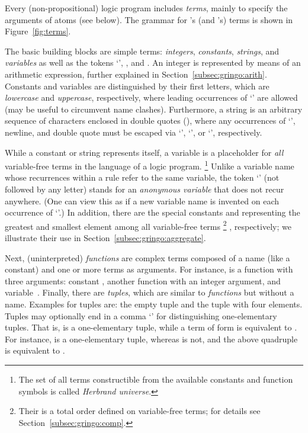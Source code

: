 Every (non-propositional) logic program includes \emph{terms},
mainly to specify the arguments of atoms (see below).
The grammar for \gringo's (and \clingo's) terms is shown in Figure~\ref{fig:terms}.

The basic building blocks are simple terms:
\emph{integers}, \emph{constants}, \emph{strings}, and \emph{variables}
as well as the tokens `', , and .
An integer is represented by means of an arithmetic expression,
further explained in Section~\ref{subsec:gringo:arith}.
Constants and variables are distinguished by their first letters,
which are \emph{lowercase} and \emph{uppercase}, respectively,
where leading occurrences of `' are allowed
(may be useful to circumvent name clashes).
Furthermore, a string is an arbitrary sequence of characters
enclosed in double quotes (),
where any occurrences of `\code{\textbackslash}', newline, and double quote
must be escaped via `\code{\textbackslash\textbackslash}', `',
or `', respectively.

While a constant or string represents itself,
a variable is a placeholder for \emph{all} variable-free terms
in the language of a logic program.%
\footnote{The set of all terms constructible from the available
          constants and function symbols is called \emph{Herbrand universe}.}
Unlike a variable name whose recurrences within a rule refer to the same variable,
the token `' (not followed by any letter)
stands for an \emph{anonymous variable} that does not recur anywhere.
(One can view this as if a new variable name is invented on each occurrence of `'.)
In addition, there are the special constants  and 
representing the greatest and smallest element among all variable-free terms%
\footnote{Their is a total order defined on variable-free terms; for details see Section~\ref{subsec:gringo:comp}.}
, respectively;
we illustrate their use in Section~\ref{subsec:gringo:aggregate}.

Next, (uninterpreted) \emph{functions} are complex terms composed of a name (like a constant)
and one or more terms as arguments.
For instance,
is a function with three arguments:
constant , another function 
with an integer argument, and variable~.
Finally, there are \emph{tuples},
which are similar to \emph{functions} but without a name.
Examples for tuples are:
the empty tuple \code{()} and
the tuple  with four elements.
Tuples may optionally end in a comma `\code{,}'
for distinguishing one-elementary tuples.
That is,  is a one-elementary tuple,
while a term of form  is equivalent to .
For instance,  is a one-elementary tuple, whereas  is not,
and the above quadruple is equivalent to .

